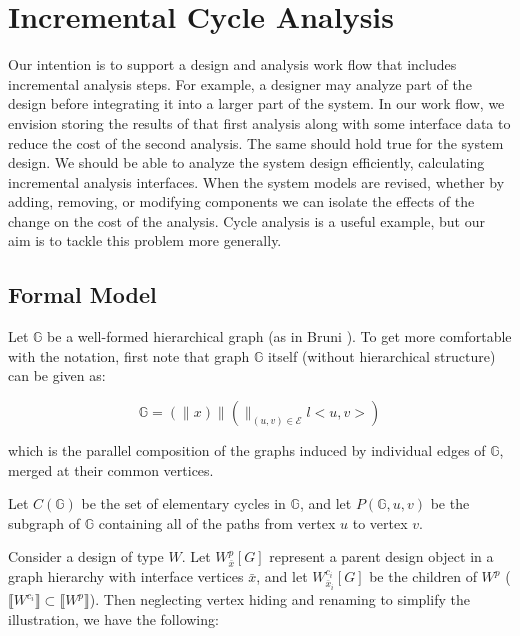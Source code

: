 \section{Incremental Cycle Analysis}

Our intention is to support a design and analysis work flow that includes 
incremental analysis steps.  For example, a designer may analyze part of the design before integrating it into a larger part of the system.  In our work flow, we envision storing the results of that first analysis along with some interface data to reduce the cost of the second analysis.  The same should hold true for the system design.  We should be able to analyze the system design efficiently, calculating incremental analysis interfaces.  When the system models are revised, whether by adding, removing, or modifying components we can isolate the effects of the change on the cost of the analysis.  Cycle analysis is a useful example, but our aim is to tackle this problem more generally.

\subsection*{Formal Model}

Let $\mathbb{G}$ be a well-formed hierarchical graph (as in Bruni
\cite{graphs:hier_algebra}).  To get more comfortable with the notation,
first note that graph $\mathbb{G}$ itself (without hierarchical structure)
can be given as:

\begin{equation}
\mathbb{G} = (\parallel x) \parallel (\parallel_{(u,v) \in \mathcal{E}} l < u, v >)
\end{equation}

which is the parallel composition of the graphs induced by individual edges of $\mathbb{G}$, merged at their common vertices.

Let $C(\mathbb{G})$ be the set of elementary cycles in $\mathbb{G}$, and 
let $P(\mathbb{G}, u, v)$ be the subgraph of $\mathbb{G}$ containing all of
the paths from vertex $u$ to vertex $v$.

Consider a design of type $W$.  Let $W_{\bar{x}}^p [G]$ 
represent a parent design object in a graph hierarchy with interface
vertices $\bar{x}$, 
and let $W_{\bar{x}_i}^{c_i} [G]$ be the children
of $W^p$ 
($\llbracket W^{c_i} \rrbracket \subset \llbracket W^p \rrbracket$).  
Then neglecting vertex hiding and renaming 
to simplify the illustration, we have the following:

